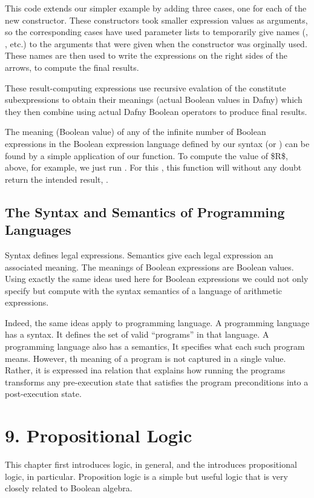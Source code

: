 \documentclass[letterpaper,10pt,english]{sphinxmanual}
\begin{document}
This code extends our simpler example by adding three cases, one for
each of the new constructor. These constructors took smaller
expression values as arguments, so the corresponding cases have used
parameter lists to temporarily give names (, , etc.) to the
arguments that were given when the constructor was orginally used.
These names are then used to write the expressions on the right sides
of the arrows, to compute the final results.

These result-computing expressions use recursive evalation of the
constitute subexpressions to obtain their meanings (actual Boolean
values in Dafny) which they then combine using actual Dafny Boolean
operators to produce final results.

The meaning (Boolean value) of any of the infinite number of Boolean
expressions in the Boolean expression language defined by our syntax
(or ) can be found by a simple application of our 
function. To compute the value of \$R\$, above, for example, we just run
. For this , this function will without any doubt return
the intended result, .


\section{The Syntax and Semantics of Programming Languages}
\label{\detokenize{08-boolean-algebra:the-syntax-and-semantics-of-programming-languages}}
Syntax defines legal expressions. Semantics give each legal expression
an associated meaning. The meanings of Boolean expressions are Boolean
values. Using exactly the same ideas used here for Boolean expressions
we could not only specify but compute with the syntax semantics of a
language of arithmetic expressions.

Indeed, the same ideas apply to programming language. A programming
language has a syntax. It defines the set of valid “programs” in that
language. A programming language also has a semantics, It specifies
what each such program means. However, th meaning of a program is not
captured in a single value. Rather, it is expressed ina relation that
explains how running the programs transforms any pre-execution state
that satisfies the program preconditions into a post-execution state.


\chapter{9. Propositional Logic}
\label{\detokenize{09-propositional-logic::doc}}\label{\detokenize{09-propositional-logic:propositional-logic}}
This chapter first introduces logic, in general, and the introduces
propositional logic, in particular. Proposition logic is a simple but
useful logic that is very closely related to Boolean algebra.
\end{document}
